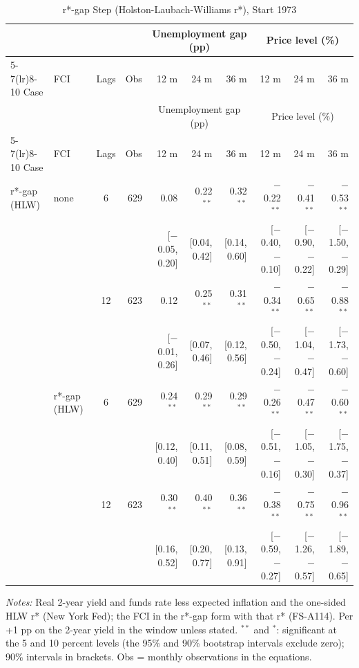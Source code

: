 \begingroup\scriptsize\setlength{\tabcolsep}{0.9pt}
\begin{longtable}{llcrrrrrrr}
\caption{r*-gap Step (Holston-Laubach-Williams r*), Start 1973}\label{tab:appF373}\\
\toprule
 & & & & \multicolumn{3}{c}{Unemployment gap (pp)} & \multicolumn{3}{c}{Price level (\%)}\\ \cmidrule(lr){5-7}\cmidrule(lr){8-10}
Case & FCI & Lags & Obs & 12 m & 24 m & 36 m & 12 m & 24 m & 36 m\\
\midrule\endfirsthead
\toprule
 & & & & \multicolumn{3}{c}{Unemployment gap (pp)} & \multicolumn{3}{c}{Price level (\%)}\\ \cmidrule(lr){5-7}\cmidrule(lr){8-10}
Case & FCI & Lags & Obs & 12 m & 24 m & 36 m & 12 m & 24 m & 36 m\\
\midrule\endhead
\bottomrule\endfoot
r*-gap (HLW) & none & 6 & 629 & 0.08 & 0.22$^{**}$ & 0.32$^{**}$ & $-$0.22$^{**}$ & $-$0.41$^{**}$ & $-$0.53$^{**}$\\
 & & & & {\scriptsize [$-$0.05, 0.20]} & {\scriptsize [0.04, 0.42]} & {\scriptsize [0.14, 0.60]} & {\scriptsize [$-$0.40, $-$0.10]} & {\scriptsize [$-$0.90, $-$0.22]} & {\scriptsize [$-$1.50, $-$0.29]}\\
 &  & 12 & 623 & 0.12 & 0.25$^{**}$ & 0.31$^{**}$ & $-$0.34$^{**}$ & $-$0.65$^{**}$ & $-$0.88$^{**}$\\
 & & & & {\scriptsize [$-$0.01, 0.26]} & {\scriptsize [0.07, 0.46]} & {\scriptsize [0.12, 0.56]} & {\scriptsize [$-$0.50, $-$0.24]} & {\scriptsize [$-$1.04, $-$0.47]} & {\scriptsize [$-$1.73, $-$0.60]}\\
 & r*-gap (HLW) & 6 & 629 & 0.24$^{**}$ & 0.29$^{**}$ & 0.29$^{**}$ & $-$0.26$^{**}$ & $-$0.47$^{**}$ & $-$0.60$^{**}$\\
 & & & & {\scriptsize [0.12, 0.40]} & {\scriptsize [0.11, 0.51]} & {\scriptsize [0.08, 0.59]} & {\scriptsize [$-$0.51, $-$0.16]} & {\scriptsize [$-$1.05, $-$0.30]} & {\scriptsize [$-$1.75, $-$0.37]}\\
 &  & 12 & 623 & 0.30$^{**}$ & 0.40$^{**}$ & 0.36$^{**}$ & $-$0.38$^{**}$ & $-$0.75$^{**}$ & $-$0.96$^{**}$\\
 & & & & {\scriptsize [0.16, 0.52]} & {\scriptsize [0.20, 0.77]} & {\scriptsize [0.13, 0.91]} & {\scriptsize [$-$0.59, $-$0.27]} & {\scriptsize [$-$1.26, $-$0.57]} & {\scriptsize [$-$1.89, $-$0.65]}\\
\end{longtable}
\begin{flushleft}\footnotesize\textit{Notes:} Real 2-year yield and funds rate less expected inflation and the one-sided HLW r* (New York Fed); the FCI in the r*-gap form with that r* (FS-A114). Per +1 pp on the 2-year yield in the window unless stated. $^{**}$ and $^{*}$: significant at the 5 and 10 percent levels (the 95\% and 90\% bootstrap intervals exclude zero); 90\% intervals in brackets. Obs = monthly observations in the equations.\end{flushleft}
\endgroup
